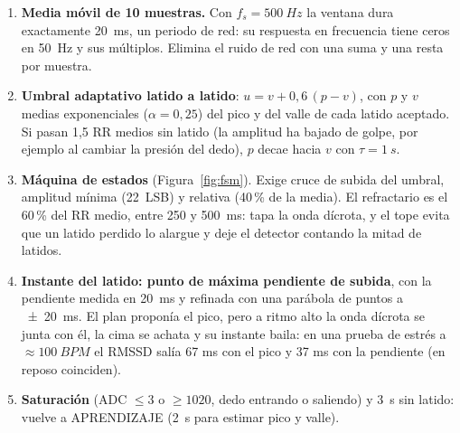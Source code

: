 \documentclass[11pt,a4paper]{article}
\begin{document}
\begin{enumerate}[leftmargin=1.4em,itemsep=2pt,topsep=2pt]
  \item \textbf{Media móvil de 10 muestras.} Con $f_s = \qty{500}{Hz}$ la ventana dura
        exactamente \qty{20}{ms}, un periodo de red: su respuesta en frecuencia tiene ceros en
        \qty{50}{Hz} y sus múltiplos. Elimina el ruido de red con una suma y una resta por
        muestra.
  \item \textbf{Umbral adaptativo latido a latido}: $u = v + 0{,}6\,(p - v)$, con $p$ y $v$
        medias exponenciales ($\alpha = 0{,}25$) del pico y del valle de cada latido aceptado.
        Si pasan 1,5 RR medios sin latido (la amplitud ha bajado de golpe, por ejemplo al
        cambiar la presión del dedo), $p$ decae hacia $v$ con $\tau = \qty{1}{s}$.
  \item \textbf{Máquina de estados} (Figura~\ref{fig:fsm}). Exige cruce de subida del umbral,
        amplitud mínima (\qty{22}{LSB}) y relativa (40\,\% de la media). El refractario es el
        60\,\% del RR medio, entre 250 y \qty{500}{ms}: tapa la onda dícrota, y el tope evita
        que un latido perdido lo alargue y deje el detector contando la mitad de latidos.
  \item \textbf{Instante del latido: punto de máxima pendiente de subida}, con la pendiente
        medida en \qty{20}{ms} y refinada con una parábola de puntos a \qty{\pm 20}{ms}. El
        plan proponía el pico, pero a ritmo alto la onda dícrota se junta con él, la cima se
        achata y su instante baila: en una prueba de estrés a $\approx\qty{100}{BPM}$ el RMSSD
        salía 67 ms con el pico y 37 ms con la pendiente (en reposo coinciden).
  \item \textbf{Saturación} (ADC $\le 3$ o $\ge 1020$, dedo entrando o saliendo) y
        \qty{3}{s} sin latido: vuelve a APRENDIZAJE (\qty{2}{s} para estimar pico y valle).
\end{enumerate}
\end{document}
